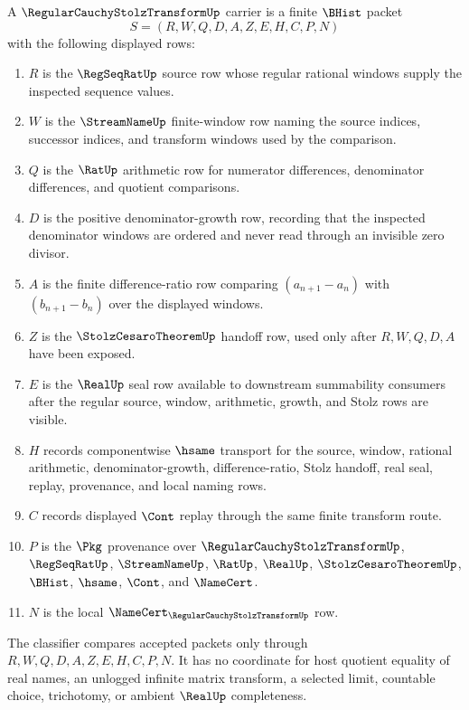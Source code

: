 \begin{definition}
\label{def:regular-cauchy-stolz-transform-carrier}
A $\RegularCauchyStolzTransformUp$ carrier is a finite $\BHist$ packet
$$
S=(R,W,Q,D,A,Z,E,H,C,P,N)
$$
with the following displayed rows:
\begin{enumerate}
\item $R$ is the $\RegSeqRatUp$ source row whose regular rational windows supply the inspected sequence values.
\item $W$ is the $\StreamNameUp$ finite-window row naming the source indices, successor indices, and transform windows used by the comparison.
\item $Q$ is the $\RatUp$ arithmetic row for numerator differences, denominator differences, and quotient comparisons.
\item $D$ is the positive denominator-growth row, recording that the inspected denominator windows are ordered and never read through an invisible zero divisor.
\item $A$ is the finite difference-ratio row comparing $(a_{n+1}-a_n)$ with $(b_{n+1}-b_n)$ over the displayed windows.
\item $Z$ is the $\StolzCesaroTheoremUp$ handoff row, used only after $R,W,Q,D,A$ have been exposed.
\item $E$ is the $\RealUp$ seal row available to downstream summability consumers after the regular source, window, arithmetic, growth, and Stolz rows are visible.
\item $H$ records componentwise $\hsame$ transport for the source, window, rational arithmetic, denominator-growth, difference-ratio, Stolz handoff, real seal, replay, provenance, and local naming rows.
\item $C$ records displayed $\Cont$ replay through the same finite transform route.
\item $P$ is the $\Pkg$ provenance over $\RegularCauchyStolzTransformUp$, $\RegSeqRatUp$, $\StreamNameUp$, $\RatUp$, $\RealUp$, $\StolzCesaroTheoremUp$, $\BHist$, $\hsame$, $\Cont$, and $\NameCert$.
\item $N$ is the local $\NameCert_{\RegularCauchyStolzTransformUp}$ row.
\end{enumerate}
The classifier compares accepted packets only through $R,W,Q,D,A,Z,E,H,C,P,N$. It has no coordinate for host quotient equality of real names, an unlogged infinite matrix transform, a selected limit, countable choice, trichotomy, or ambient $\RealUp$ completeness.
\end{definition}

